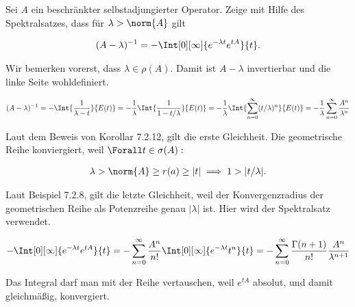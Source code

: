 \begin{exercise}[37/3]

Sei $A$ ein beschränkter selbstadjungierter Operator.
Zeige mit Hilfe des Spektralsatzes, dass für $\lambda > \norm{A}$ gilt

\begin{align*}
  (A - \lambda)^{-1}
  =
  -\Int[0][\infty]{e^{-\lambda t} e^{t A}}{t}.
\end{align*}

\end{exercise}

\begin{solution}

\phantom{}


Wir bemerken vorerst, dass $\lambda \in \rho(A)$.
Damit ist $A - \lambda$ invertierbar und die linke Seite wohldefiniert.

\begin{align*}
  (A - \lambda)^{-1}
  =
  -\Int{\frac{1}{\lambda - t}}{E(t)}
  =
  -\frac{1}{\lambda}
  \Int{\frac{1}{1 - t / \lambda}}{E(t)}
  =
  -\frac{1}{\lambda}
  \Int{\sum_{n=0}^\infty (t / \lambda)^n}{E(t)}
  =
  -\frac{1}{\lambda}
  \sum_{n=0}^\infty
  \frac{A^n}{\lambda^n}
\end{align*}


Laut dem Beweis von Korollar 7.2.12, gilt die erste Gleichheit.
Die geometrische Reihe konviergiert, weil $\Forall t \in \sigma(A):$

\begin{align*}
  \lambda > \norm{A} \geq r(a) \geq |t|
  \implies
  1 > |t / \lambda|.
\end{align*}


Laut Beispiel 7.2.8, gilt die letzte Gleichheit, weil der Konvergenzradius der geometrischen Reihe als Potenzreihe genau $|\lambda|$ ist.
Hier wird der Spektralsatz verwendet.

\begin{align*}
  -\Int[0][\infty]{e^{-\lambda t} e^{t A}}{t}
  =
  -\sum_{n=0}^\infty
  \frac{A^n}{n!}
  \Int[0][\infty]{e^{-\lambda t} t^n}{t}
  =
  -\sum_{n=0}^\infty
  \frac{\Gamma(n+1)}{n!}
  \frac{A^n}{\lambda^{n+1}}
\end{align*}

Das Integral darf man mit der Reihe vertauschen, weil $e^{t A}$ absolut, und damit gleichmäßig, konvergiert.


\end{solution}
